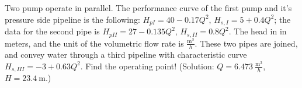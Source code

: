 
\vspace{1cm}

Two pump operate in parallel. The performance curve of the first pump and it's pressure side pipeline is the following: $H_{pI} = 40 - 0.17Q^2$, $H_{s,I} = 5 + 0.4Q ^2$; the data for the second pipe is $H_{pII} = 27 - 0.135Q^2$, $H_{s,II} = 0.8Q ^2$. The head in in meters, and the unit of the volumetric flow rate is $\frac{\mathrm{m^3}}{h}$. These two pipes are joined, and convey water through a third pipeline with characteristic curve $H_{s,III} = -3 + 0.63Q ^2$. Find the operating point! (Solution: $Q = 6.473~\frac{\mathrm{m^3}}{h}$, $H=23.4~\mathrm{m}$.)
